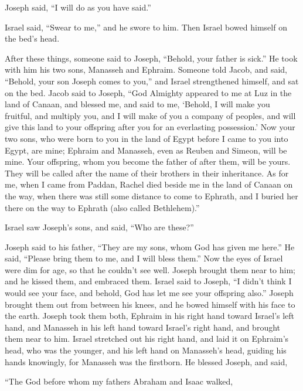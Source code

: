 Joseph said, “I will do as you have said.”

\myverse{}Israel said, “Swear to me,” and he swore to him. Then Israel bowed himself on the bed’s head.

\mychapter{}
\myverse*{}After these things, someone said to Joseph, “Behold, your father is sick.” He took with him his two sons, Manasseh and Ephraim. \myverse{}Someone told Jacob, and said, “Behold, your son Joseph comes to you,” and Israel strengthened himself, and sat on the bed. \myverse{}Jacob said to Joseph, “God Almighty appeared to me at Luz in the land of Canaan, and blessed me, \myverse{}and said to me, ‘Behold, I will make you fruitful, and multiply you, and I will make of you a company of peoples, and will give this land to your offspring after you for an everlasting possession.’ \myverse{}Now your two sons, who were born to you in the land of Egypt before I came to you into Egypt, are mine; Ephraim and Manasseh, even as Reuben and Simeon, will be mine. \myverse{}Your offspring, whom you become the father of after them, will be yours. They will be called after the name of their brothers in their inheritance. \myverse{}As for me, when I came from Paddan, Rachel died beside me in the land of Canaan on the way, when there was still some distance to come to Ephrath, and I buried her there on the way to Ephrath (also called Bethlehem).”

\myverse{}Israel saw Joseph’s sons, and said, “Who are these?”

\myverse{}Joseph said to his father, “They are my sons, whom God has given me here.”
He said, “Please bring them to me, and I will bless them.” \myverse{}Now the eyes of Israel were dim for age, so that he couldn’t see well. Joseph brought them near to him; and he kissed them, and embraced them. \myverse{}Israel said to Joseph, “I didn’t think I would see your face, and behold, God has let me see your offspring also.” \myverse{}Joseph brought them out from between his knees, and he bowed himself with his face to the earth. \myverse{}Joseph took them both, Ephraim in his right hand toward Israel’s left hand, and Manasseh in his left hand toward Israel’s right hand, and brought them near to him. \myverse{}Israel stretched out his right hand, and laid it on Ephraim’s head, who was the younger, and his left hand on Manasseh’s head, guiding his hands knowingly, for Manasseh was the firstborn. \myverse{}He blessed Joseph, and said,

“The God before whom my fathers Abraham and Isaac walked,

